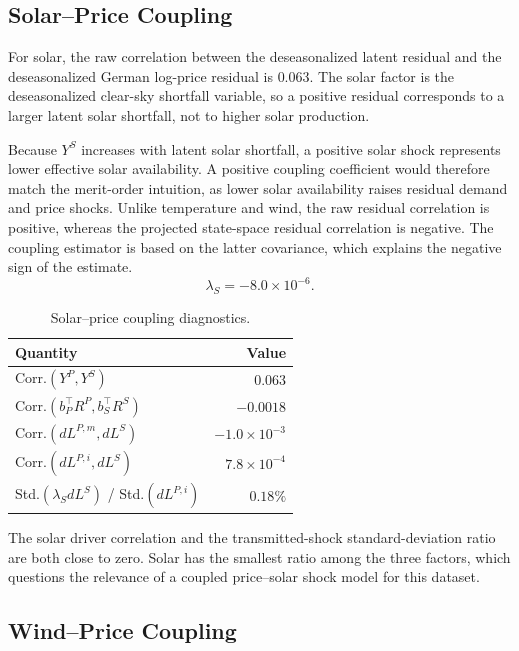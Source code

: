 \subsection{Solar--Price Coupling}\label{ssec:solar-price-coupling}

For solar, the raw correlation between the deseasonalized latent residual and
the deseasonalized German log-price residual is \(0.063\). The solar factor is
the deseasonalized clear-sky shortfall variable, so a positive residual
corresponds to a larger latent solar shortfall, not to higher solar production.

Because \(Y^S\) increases with latent solar shortfall, a positive solar shock
represents lower effective solar availability. A positive coupling coefficient
would therefore match the merit-order intuition, as lower solar availability raises
residual demand and price shocks. Unlike temperature and wind, the raw residual
correlation is positive, whereas the projected state-space residual correlation
is negative. The coupling estimator is based on the latter covariance, which
explains the negative sign of the estimate.
\[
  \lambda_S = -8.0\times 10^{-6}.
\]

\begin{table}[H]
  \centering
  \caption{Solar--price coupling diagnostics.}
  \label{tab:solar-price-coupling-diagnostics}
  \begin{tabular}{@{}lr@{}}
    \toprule
    Quantity & Value \\
    \midrule
    Corr.\((Y^P,Y^S)\) & \(0.063\) \\
    Corr.\((b_P^\top R^P,b_S^\top R^S)\) & \(-0.0018\) \\
    Corr.\((dL^{P,m},dL^S)\) & \(-1.0{\times}10^{-3}\) \\
    Corr.\((dL^{P,i},dL^S)\) & \(7.8{\times}10^{-4}\) \\
    Std.\((\lambda_S dL^S)\) / Std.\((dL^{P,i})\) & \(0.18\%\) \\
    \bottomrule
  \end{tabular}
\end{table}

The solar driver correlation and the transmitted-shock standard-deviation ratio
are both close to zero. Solar has the smallest ratio among the three factors,
which questions the relevance of a coupled price--solar shock model for this
dataset.

\subsection{Wind--Price Coupling}\label{ssec:wind-price-coupling}

